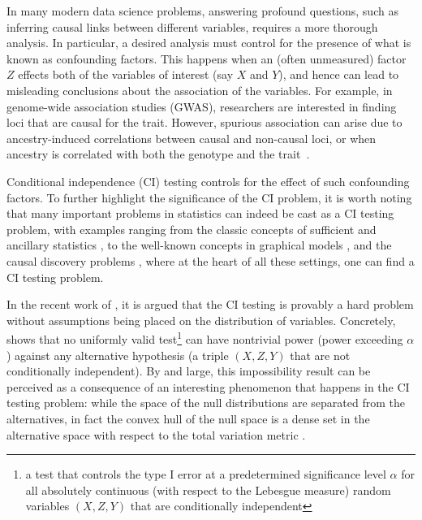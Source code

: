 \documentclass[11pt]{article}
\begin{document}
 In many modern data science problems, answering profound questions, such as inferring causal links between different variables, requires a more thorough analysis. In particular, a desired analysis must control for the presence of what is known as  confounding factors.  This happens when an (often unmeasured) factor $Z$ effects both of the variables of interest (say $X$ and $Y$), and hence  can lead to misleading conclusions about the association of the variables. For example, in genome-wide association studies (GWAS), researchers are interested in finding loci that are causal for the trait. However, spurious association can arise due to ancestry-induced correlations between causal and non-causal loci, or when ancestry is correlated with both the genotype and the trait~\cite{campbell2005demonstrating,bhaskar2017novel}.
 
 Conditional independence (CI) testing controls for the effect of such confounding factors. To further highlight the significance of the CI problem, it is worth noting that many important problems in statistics can indeed be cast as a CI testing problem, with examples ranging from the classic concepts of sufficient and ancillary statistics \cite{dawid1979conditional}, to the well-known concepts in graphical models \cite{koller2009probabilistic, friedman2004inferring, dobra2004sparse}, and the causal discovery problems \cite{pearl2000models, zhang2012kernel, peters2017elements}, where at the heart of all these settings, one can find a CI testing problem. 

In the recent work of \cite{shah2020hardness}, it is argued that the CI testing is provably a hard problem without assumptions being placed on the distribution of variables. Concretely, \cite{shah2020hardness} shows that no uniformly valid test\footnote{a test that controls the type I error at a predetermined significance level $\alpha$ for all absolutely continuous (with respect to the Lebesgue measure)  random variables $(X,Z,Y)$ that are conditionally independent} can have nontrivial power (power  exceeding $\alpha$) against any alternative hypothesis (a triple $(X,Z,Y)$ that are not conditionally independent).  By and large, this impossibility result can be perceived as a consequence of an interesting phenomenon that happens in the CI testing problem: while the space of the null distributions are separated from the alternatives, in fact the convex hull of the null space is a dense set in the alternative space with respect to the total variation metric \cite{shah2020hardness}.
\end{document}
